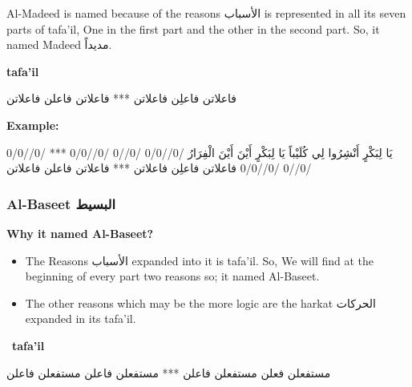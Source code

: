 Al-Madeed is named because of the reasons \textarabic{الأسباب} is represented in all its seven parts of tafa'il, One in the first part and the other in the second part. So, it named Madeed \textarabic{مديداً}.


\textbf{tafa'il}

\begin{Arabic}
	\begin{traditionalpoem*}
فاعلاتن فاعلِن فاعلاتن *** فاعلاتن فاعلن فاعلاتن
          

	\end{traditionalpoem*}
      \end{Arabic}


\textbf{Example:}

\begin{Arabic}
	\begin{traditionalpoem*}
    يَا لِبَكْرٍ أَنْشِرُوا لِي كُلَيْباً	يَا لِبَكْرٍ أَيْنَ أَيْنَ الْفِرَارُ
/0//0/0 /0//0 /0//0/0 *** /0//0/0 /0//0 /0//0/0
فاعلاتن فاعلِن فاعلاتن *** فاعلاتن فاعلن فاعلاتن
          
	\end{traditionalpoem*}
      \end{Arabic}
\newpage




\subsubsection{Al-Baseet \textarabic{البسيط}}

\textbf{Why it named Al-Baseet?}
\begin{itemize}
Al-Baseet there is a different idea behind this name 
\item The Reasons \textarabic{الأسباب} expanded into it is tafa'il. So, We will find at the beginning of every part two reasons so; it named Al-Baseet.
\item The other reasons which may be the more logic are the harkat  \textarabic{الحركات} expanded in its tafa'il.
\end{itemize}



\
\textbf{tafa'il}

\begin{Arabic}
	\begin{traditionalpoem*}
مستفعلن فعلن مستفعلن فاعلن *** مستفعلن فاعلن مستفعلن فاعلن
          

	\end{traditionalpoem*}
      \end{Arabic}


